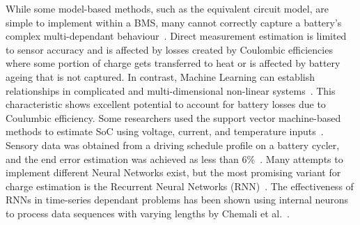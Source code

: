 %
%
While some model-based methods, such as the equivalent circuit model, are simple to implement within a BMS, many cannot correctly capture a battery's complex multi-dependant behaviour~\cite{6953745}.
Direct measurement estimation is limited to sensor accuracy and is affected by losses created by Coulombic efficiencies~\cite{Smith_2010} where some portion of charge gets transferred to heat or is affected by battery ageing that is not captured.
%
In contrast, Machine Learning can establish relationships in complicated and multi-dimensional non-linear systems~\cite{hansen_support_2005,anton_battery_2013,he_state_2014}.
This characteristic shows excellent potential to account for battery losses due to Coulumbic efficiency.
Some researchers used the support vector machine-based methods to estimate SoC using voltage, current, and temperature inputs~\cite{hansen_support_2005,anton_battery_2013}.
Sensory data was obtained from a driving schedule profile on a battery cycler, and the end error estimation was achieved as less than 6\%~\cite{he_state_2014}.
Many attempts to implement different Neural Networks exist, but the most promising variant for charge estimation is the Recurrent Neural Networks (RNN)~\cite{song_lithium-ion_2018, Chemali2017, mamo_long_2020, jiao_gru-rnn_2020, xiao_accurate_2019, javid_adaptive_2020, zhang_deep_2020}.
The effectiveness of RNNs in time-series dependant problems has been shown using internal neurons to process data sequences with varying lengths by Chemali et al.~\cite{Chemali2017}.

